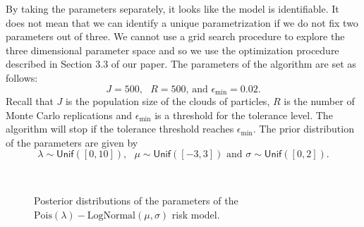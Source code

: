 \documentclass[10pt]{article}
\newcommand*{\UnifDist}{\mathsf{Unif}}
\begin{document}
By taking the parameters separately, it looks like the model is identifiable. It does not mean that we can identify a unique parametrization if we do not fix two parameters out of three. We cannot use a grid search procedure to explore the three dimensional parameter space and so we use the optimization procedure described in Section 3.3 of our paper. The parameters of the algorithm are set as follows: 
$$
J = 500,\text{ }R= 500\text{, and } \epsilon_{\min} = 0.02.
$$
Recall that $J$ is the population size of the clouds of particles, $R$ is the number of Monte Carlo replications and $\epsilon_{\min}$ is a threshold for the tolerance level. The algorithm will stop if the tolerance threshold reaches $\epsilon_{\min}$. The prior distribution of the parameters are given by 
$$
\lambda \sim \UnifDist([0, 10]),\text{ }\mu\sim \UnifDist([-3, 3])\text{ and }\sigma\sim \UnifDist([0, 2]).
$$

\begin{figure}[!ht]
  \begin{center}
    \\
    \caption{Posterior distributions of the parameters of the $\text{Pois}(\lambda)-\text{LogNormal}(\mu , \sigma)$ risk model.}
    \label{fig:posterior_pure_premium}
  \end{center}
\end{figure}
\end{document}
